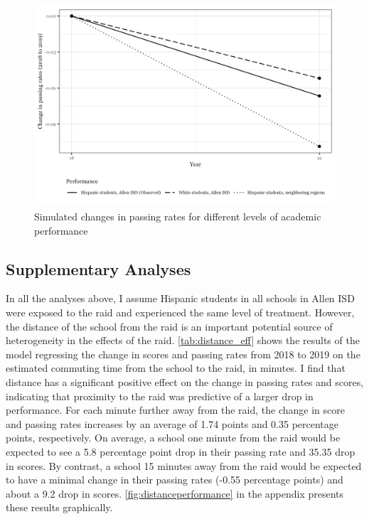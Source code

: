 \documentclass[hidelinks,twoside]{article}
\begin{document}
\begin{figure}[!ht]
\caption[]{Simulated changes in passing rates for different levels of academic performance}
\centerline{\includegraphics[scale=0.7]{differences_passing_rate_drop.png}}
\label{fig:simchanges}
\end{figure} 


\subsection*{Supplementary Analyses}

In all the analyses above, I assume Hispanic students in all schools in Allen ISD were exposed to the raid and experienced the same level of treatment. However, the distance of the school from the raid is an important potential source of heterogeneity in the effects of the raid. \autoref{tab:distance_eff} shows the results of the model regressing the change in scores and passing rates from 2018 to 2019 on the estimated commuting time from the school to the raid, in minutes. I find that distance has a significant positive effect on the change in passing rates and scores, indicating that proximity to the raid was predictive of a larger drop in performance. For each minute further away from the raid, the change in score and passing rates increases by an average of 1.74 points and 0.35 percentage points, respectively. On average, a school one minute from the raid would be expected to see a 5.8 percentage point drop in their passing rate and 35.35 drop in scores. By contrast, a school 15 minutes away from the raid would be expected to have a minimal change in their passing rates (-0.55 percentage points) and about a 9.2 drop in scores. \autoref{fig:distanceperformance} in the appendix presents these results graphically. 
\end{document}
